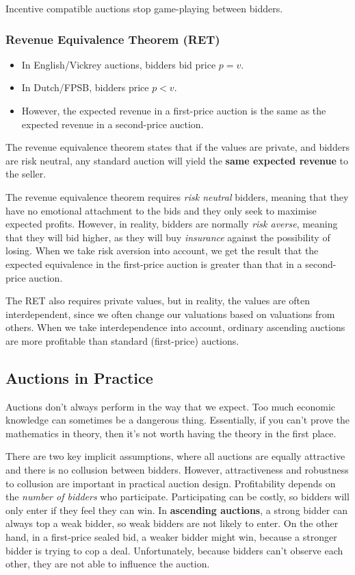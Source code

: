 \documentclass[11pt,a4paper,titlepage,dvipsnames,cmyk]{scrartcl}
\begin{document}
Incentive compatible auctions stop game-playing between bidders.

\subsubsection{Revenue Equivalence Theorem (RET)}
\begin{itemize}
    \item In English/Vickrey auctions, bidders bid price $p = v$.
    \item In Dutch/FPSB, bidders price $p < v$.
    \item However, the expected revenue in a first-price auction is the same as the expected revenue in a second-price auction.
\end{itemize}

The revenue equivalence theorem states that if the values are private, and bidders are risk neutral, any standard auction will yield the \textbf{same expected revenue} to the seller.

The revenue equivalence theorem requires \textit{risk neutral} bidders, meaning that they have no emotional attachment to the bids and they only seek to maximise expected profits. However, in reality, bidders are normally \textit{risk averse}, meaning that they will bid higher, as they will buy \textit{insurance} against the possibility of losing. When we take risk aversion into account, we get the result that the expected equivalence in the first-price auction is greater than that in a second-price auction.

The RET also requires private values, but in reality, the values are often interdependent, since we often change our valuations based on valuations from others. When we take interdependence into account, ordinary ascending auctions are more profitable than standard (first-price) auctions.

\subsection{Auctions in Practice}
Auctions don't always perform in the way that we expect. Too much economic knowledge can sometimes be a dangerous thing. Essentially, if you can't prove the mathematics in theory, then it's not worth having the theory in the first place.

There are two key implicit assumptions, where all auctions are equally attractive and there is no collusion between bidders. However, attractiveness and robustness to collusion are important in practical auction design. Profitability depends on the \textit{number of bidders} who participate. Participating can be costly, so bidders will only enter if they feel they can win. In \textbf{ascending auctions}, a strong bidder can always top a weak bidder, so weak bidders are not likely to enter. On the other hand, in a first-price sealed bid, a weaker bidder might win, because a stronger bidder is trying to cop a deal. Unfortunately, because bidders can't observe each other, they are not able to influence the auction.
\end{document}
